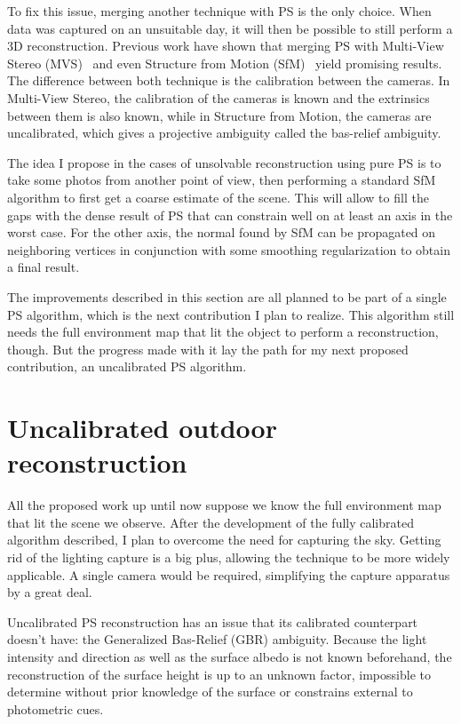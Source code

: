 To fix this issue, merging another technique with PS is the only choice. When data was captured on an unsuitable day, it will then be possible to still perform a 3D reconstruction. Previous work have shown that merging PS with Multi-View Stereo (MVS)~\cite{Beljan2012,Zhou2013,ackermann-3dv-14,HernandezEsteban2008,inose-tcva-13,shi-3dv-14} and even Structure from Motion (SfM)~\cite{zhang-iccv-03,lim-iccv-05} yield promising results. The difference between both technique is the calibration between the cameras. In Multi-View Stereo, the calibration of the cameras is known and the extrinsics between them is also known, while in Structure from Motion, the cameras are uncalibrated, which gives a projective ambiguity called the bas-relief ambiguity.

The idea I propose in the cases of unsolvable reconstruction using pure PS is to take some photos from another point of view, then performing a standard SfM algorithm to first get a coarse estimate of the scene. This will allow to fill the gaps with the dense result of PS that can constrain well on at least an axis in the worst case. For the other axis, the normal found by SfM can be propagated on neighboring vertices in conjunction with some smoothing regularization to obtain a final result.

The improvements described in this section are all planned to be part of a single PS algorithm, which is the next contribution I plan to realize. This algorithm still needs the full environment map that lit the object to perform a reconstruction, though. But the progress made with it lay the path for my next proposed contribution, an uncalibrated PS algorithm.

\section{Uncalibrated outdoor reconstruction}
\label{sec:uncalib}

All the proposed work up until now suppose we know the full environment map that lit the scene we observe. After the development of the fully calibrated algorithm described, I plan to overcome the need for capturing the sky. Getting rid of the lighting capture is a big plus, allowing the technique to be more widely applicable. A single camera would be required, simplifying the capture apparatus by a great deal.

Uncalibrated PS reconstruction has an issue that its calibrated counterpart doesn't have: the Generalized Bas-Relief (GBR) ambiguity. Because the light intensity and direction as well as the surface albedo is not known beforehand, the reconstruction of the surface height is up to an unknown factor, impossible to determine without prior knowledge of the surface or constrains external to photometric cues.

